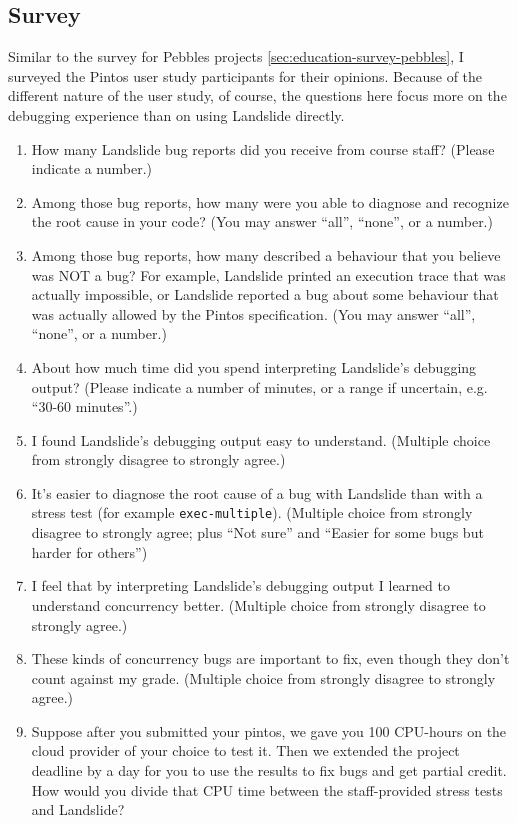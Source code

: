 \subsection{Survey}
\label{sec:education-survey-pintos}

Similar to the survey for Pebbles projects
\cref{sec:education-survey-pebbles},
I surveyed the Pintos user study participants for their opinions.
Because of the different nature of the user study, of course,
the questions here focus more on the debugging experience than on using Landslide directly.

\begin{enumerate}
	\item How many Landslide bug reports did you receive from course staff? (Please indicate a number.)
	\item Among those bug reports, how many were you able to diagnose and recognize the root cause in your code? (You may answer ``all'', ``none'', or a number.)
	\item Among those bug reports, how many described a behaviour that you believe was NOT a bug? For example, Landslide printed an execution trace that was actually impossible, or Landslide reported a bug about some behaviour that was actually allowed by the Pintos specification. (You may answer ``all'', ``none'', or a number.)
	\item About how much time did you spend interpreting Landslide's debugging output? (Please indicate a number of minutes, or a range if uncertain, e.g. ``30-60 minutes''.)
	\item I found Landslide's debugging output easy to understand.
		(Multiple choice from strongly disagree to strongly agree.)
	\item It's easier to diagnose the root cause of a bug with Landslide than with a stress test (for example {\tt exec-multiple}).
		(Multiple choice from strongly disagree to strongly agree; plus ``Not sure'' and ``Easier for some bugs but harder for others'')
	\item I feel that by interpreting Landslide's debugging output I learned to understand concurrency better.
		(Multiple choice from strongly disagree to strongly agree.)
	\item These kinds of concurrency bugs are important to fix, even though they don't count against my grade.
		(Multiple choice from strongly disagree to strongly agree.)
	\item Suppose after you submitted your pintos, we gave you 100 CPU-hours on the cloud provider of your choice to test it. Then we extended the project deadline by a day for you to use the results to fix bugs and get partial credit. How would you divide that CPU time between the staff-provided stress tests and Landslide?

\end{enumerate}
